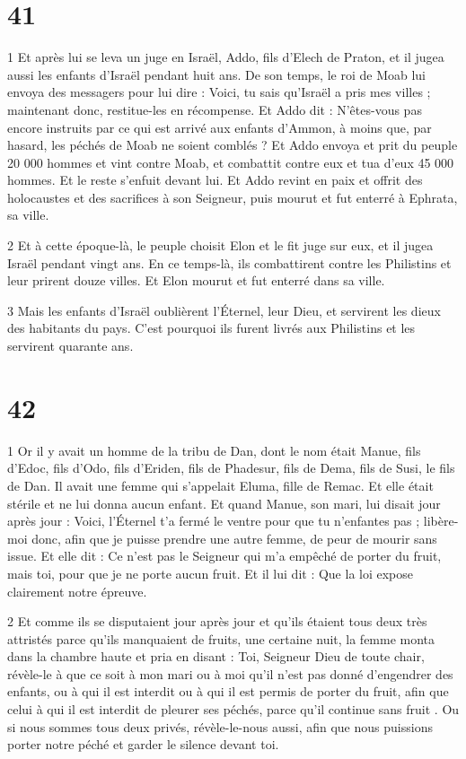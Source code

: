 \chapter{41}

\par 1 Et après lui se leva un juge en Israël, Addo, fils d'Elech de Praton, et il jugea aussi les enfants d'Israël pendant huit ans. De son temps, le roi de Moab lui envoya des messagers pour lui dire : Voici, tu sais qu'Israël a pris mes villes ; maintenant donc, restitue-les en récompense. Et Addo dit : N'êtes-vous pas encore instruits par ce qui est arrivé aux enfants d'Ammon, à moins que, par hasard, les péchés de Moab ne soient comblés ? Et Addo envoya et prit du peuple 20 000 hommes et vint contre Moab, et combattit contre eux et tua d'eux 45 000 hommes. Et le reste s'enfuit devant lui. Et Addo revint en paix et offrit des holocaustes et des sacrifices à son Seigneur, puis mourut et fut enterré à Ephrata, sa ville.

\par 2 Et à cette époque-là, le peuple choisit Elon et le fit juge sur eux, et il jugea Israël pendant vingt ans. En ce temps-là, ils combattirent contre les Philistins et leur prirent douze villes. Et Elon mourut et fut enterré dans sa ville.

\par 3 Mais les enfants d'Israël oublièrent l'Éternel, leur Dieu, et servirent les dieux des habitants du pays. C'est pourquoi ils furent livrés aux Philistins et les servirent quarante ans.

\chapter{42}

\par 1 Or il y avait un homme de la tribu de Dan, dont le nom était Manue, fils d'Edoc, fils d'Odo, fils d'Eriden, fils de Phadesur, fils de Dema, fils de Susi, le fils de Dan. Il avait une femme qui s'appelait Eluma, fille de Remac. Et elle était stérile et ne lui donna aucun enfant. Et quand Manue, son mari, lui disait jour après jour : Voici, l'Éternel t'a fermé le ventre pour que tu n'enfantes pas ; libère-moi donc, afin que je puisse prendre une autre femme, de peur de mourir sans issue. Et elle dit : Ce n'est pas le Seigneur qui m'a empêché de porter du fruit, mais toi, pour que je ne porte aucun fruit. Et il lui dit : Que la loi expose clairement notre épreuve.

\par 2 Et comme ils se disputaient jour après jour et qu'ils étaient tous deux très attristés parce qu'ils manquaient de fruits, une certaine nuit, la femme monta dans la chambre haute et pria en disant : Toi, Seigneur Dieu de toute chair, révèle-le à que ce soit à mon mari ou à moi qu'il n'est pas donné d'engendrer des enfants, ou à qui il est interdit ou à qui il est permis de porter du fruit, afin que celui à qui il est interdit de pleurer ses péchés, parce qu'il continue sans fruit . Ou si nous sommes tous deux privés, révèle-le-nous aussi, afin que nous puissions porter notre péché et garder le silence devant toi.


